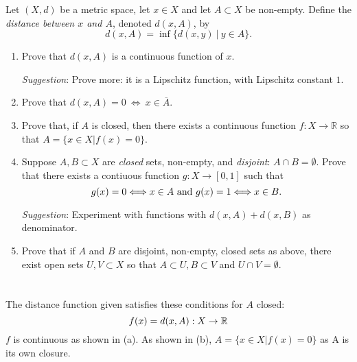 \documentclass{jhwhw}
\newcommand{\R}{{\mathbb R}}
\begin{document}
\problem{}%
Let $(X,d)$ be a metric space, let $x\in X$ and let $A\subset X$ be non-empty.  Define the \emph{distance between $x$ and $A$}, denoted $d(x,A)$, by
$$
d(x,A) = \inf \{d(x,y)\  | \  y\in A\}.
$$
\begin{enumerate}
	\item Prove that $d(x,A)$ is a continuous function of $x$. 
	
	\emph{Suggestion}:  Prove more: it is a Lipschitz function, with Lipschitz constant $1$.
	
	\item Prove that $d(x,A) = 0\  \Longleftrightarrow \  x\in\overline{A}$.
	
	\item Prove that, if $A$ is closed, then there exists a continuous function $f:X\to\R$ so that $ A = \{x\in X | f(x) = 0\}$.
	
	\item Suppose $A,B\subset X$ are \emph{closed} sets, non-empty, and \emph{disjoint}: $A\cap B = \emptyset$. Prove that there exists a contiuous function $g:X\to [0,1]$ such that 
	$$
	g(x) = 0 \Longleftrightarrow x\in A \hbox{ and } g(x) = 1 \Longleftrightarrow x\in B.
	$$
	
	\emph{Suggestion}: Experiment with  functions with $d(x,A) + d(x,B)$ as denominator.
	
	\item Prove that if $A$ and $B$ are disjoint, non-empty, closed sets as above, there exist open sets $U,V\subset X$ so that $A\subset U, B\subset V$ and $U\cap V = \emptyset$.
\end{enumerate}

\solution{}
\part{}%


\part{}%



\part{}%
The distance function given satisfies these conditions for $A$ closed:
\begin{equation}
f(x) = d(x,A): X\to \R\\
\end{equation}
$f$ is continuous as shown in (a). As shown in (b), $ A = \{x\in X | f(x) = 0\}$ as A is its own closure.
\end{document}
